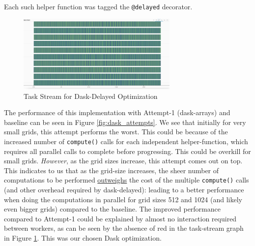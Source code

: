 \documentclass[a4paper,10pt]{article}
\begin{document}
Each such helper function was tagged the \verb|@delayed| decorator.
\begin{figure}[h]
  \centering
  \includegraphics[width=0.7\textwidth]{images/dask/dask_opt2.png}
  \caption{Task Stream for Dask-Delayed Optimization}
  \label{fig:dask_opt2_stream}
\end{figure}
The performance of this implementation with Attempt-1 (dask-arrays) and baseline can be seen in Figure \ref{fig:dask_attempts}.
We see that initially for very small grids, this attempt performs the worst.
This could be because of the increased number of \verb|compute()| calls for each independent helper-function, which requires all parallel calls to complete before progressing.
This could be overkill for small grids.
\textit{However}, as the grid sizes increase, this attempt comes out on top. This indicates to us that as the grid-size increases, the sheer number of computations to be performed \underline{outweighs} the cost of the multiple \verb|compute()| calls (and other overhead required by dask-delayed): leading to a better performance when doing the computations in parallel for grid sizes 512 and 1024 (and likely even bigger grids) compared to the baseline.
The improved performance compared to Attempt-1 could be explained by almost no interaction required between workers, as can be seen by the absence of red in the task-stream graph in Figure \ref{fig:dask_opt2_stream}.
This was our chosen Dask optimization.
\end{document}
